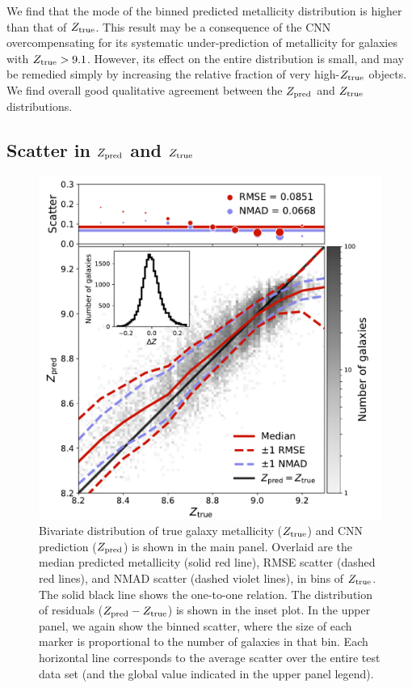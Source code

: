\documentclass[fleqn,usenatbib]{mnras}
\begin{document}
We find that the mode of the binned predicted metallicity distribution is higher than that of $Z_{\rm true}$. This result may be a consequence of the CNN overcompensating for its systematic under-prediction of metallicity for galaxies with $Z_{\rm true} > 9.1$. However, its effect on the entire distribution is small, and may be remedied simply by increasing the relative fraction of very high-$Z_{\rm true}$ objects. We find overall good qualitative agreement between the $Z_{\rm pred}$ and $Z_{\rm true}$ distributions.

\subsection{Scatter in $Z_{\rm pred}$ and $Z_{\rm true}$}
\begin{figure}
	\includegraphics[width=\columnwidth]{02-prediction_summary.pdf}
	\caption{\label{fig:predicting-metallicity}
		Bivariate distribution of true galaxy metallicity ($Z_{\rm true}$) and CNN prediction ($Z_{\rm pred}$) is shown in the main panel. Overlaid are the median predicted metallicity (solid red line), RMSE scatter (dashed red lines), and NMAD scatter (dashed violet lines), in bins of $Z_{\rm true}$. The solid black line shows the one-to-one relation. The distribution of residuals ($Z_{\rm pred} - Z_{\rm true}$) is shown in the inset plot. In the upper panel, we again show the binned scatter, where the size of each marker is proportional to the number of galaxies in that bin. Each horizontal line corresponds to the average scatter over the entire test data set (and the global value indicated in the upper panel legend).}
\end{figure}
\end{document}
